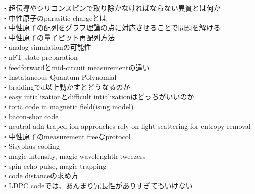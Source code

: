 \documentclass[a4paper,10.5pt]{ltjsarticle}
\begin{document}
\vspace{50pt}
・超伝導やシリコンスピンで取り除かなければならない異質とは何か\\
・中性原子のparasitic chargeとは\\
・中性原子の配列をグラフ理論の点に対応させることで問題を解ける\\
・中性原子の量子ビット再配列方法\\
・analog simulationの可能性\\
・nFT state preparation\\
・feedforwardとmid-circuit measurementの違い\\
・Instataneous Quantum Polynomial\\
・braidingでd以上動かすとどうなるのか\\
・easy intializationとdifficult intializationはどっちがいいのか\\
・toric code in magnetic field(ising model)\\
・bacon-shor code\\
・neutral adn traped ion approaches rely on light scattering for entropy removal\\
・中性原子のmeasurement freeなprotocol\\
・Sisyphus cooling\\
・magic intensity, magic-wavelenghth tweezers\\
・spin echo pulse, magic trapping\\
・code distanceの求め方\\
・LDPC codeでは、あんまり冗長性がありすぎてもいけない\\
\\
\end{document}
